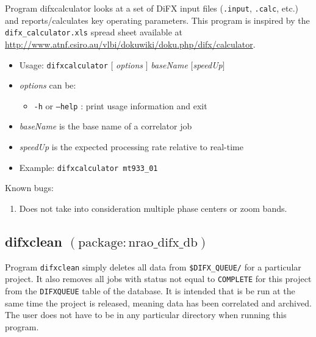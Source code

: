 Program difxcalculator looks at a set of DiFX input files ({\tt .input}, {\tt .calc}, etc.) and reports/calculates key operating parameters.
This program is inspired by the {\tt difx\_calculator.xls} spread sheet available at \url{http://www.atnf.csiro.au/vlbi/dokuwiki/doku.php/difx/calculator}.

\begin{itemize}
\item[] Usage: {\tt difxcalculator} $[$ {\em options} $]$ {\em baseName} $[${\em speedUp}$]$
\item[] {\em options} can be:
\begin{itemize}
\item[] {\tt -h} or {\tt --help} : print usage information and exit
\end{itemize}
\item[] {\em baseName} is the base name of a correlator job
\item[] {\em speedUp} is the expected processing rate relative to real-time
\item[] Example: {\tt difxcalculator mt933\_01}
\end{itemize}

\noindent
Known bugs:
\begin{enumerate}
\item Does not take into consideration multiple phase centers or zoom bands.
\end{enumerate}







\subsection{difxclean {\small $\mathrm{(package: nrao\_difx\_db)}$}} \label{sec:difxclean}

Program {\tt difxclean} simply deletes all data from {\tt \$DIFX\_QUEUE/} for a particular project.
It also removes all jobs with status not equal to {\tt COMPLETE} for this project from the {\tt DIFXQUEUE} table of the database.
It is intended that is be run at the same time the project is released, meaning data has been correlated and archived.
The user does not have to be in any particular directory when running this program.

